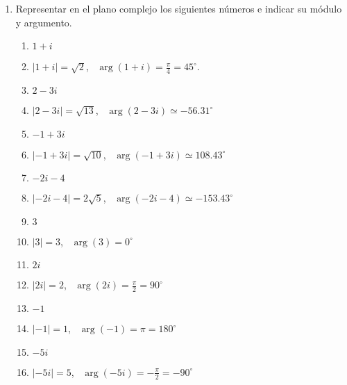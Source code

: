 \documentclass[a4paper]{article}
\newcommand{\answer}{\item[**]}
\newcommand{\exercise}{\item}
\newcommand{\df}[2]{\displaystyle\frac{#1}{#2}}
\begin{document}
\begin{enumerate}
\begin{multicols}{2}
\begin{enumerate} [label=(\alph*)]
		\item $\df{5-2i}{5i-2}$
		\answer $-\df{20}{29}-\df{21}{29}i$. \href{https://youtu.be/UK70wbES5L8}{Resolución}

		\item $\df{3+2i}{-3-4i}$
		\answer $-\df{17}{25}+\df{6}{25}i$. \href{https://youtu.be/Khdqus5O4jk}{Resolución}

		\item $\df{-3i+1}{4i-2}$
		\answer $-\df{7}{10}+\df{1}{10}i$. \href{https://youtu.be/VguP5HyAzpQ}{Resolución}

		\item $(1-2i)^2$
		\answer $-3-4i$

		\item $\df{i}{i+1}+\left(\df{1+i}{i}\right)^2$
		\answer $\df{1}{2}-\df{3}{2}i$. \href{https://youtu.be/edNxbzDs2wA}{Resolución}

		\item $(1+2i)^3$
		\answer $-11-2i$

	\end{enumerate}
	\end{multicols}


	\exercise Representar en el plano complejo los siguientes números e indicar su módulo y argumento.
	\begin{multicols}{3}
	\begin{enumerate} [label=(\alph*)]
		
		\item $1+i$
		\answer $|1+i|=\sqrt{2}$, ~$\arg(1+i)=\df{\pi}{4}=45^{\circ}$. 

		\item $2-3i$
		\answer $|2-3i|=\sqrt{13}$, ~$\arg(2-3i) \simeq -56.31^{\circ}$

		\item $-1+3i$
		\answer $|-1+3i|=\sqrt{10}$, ~$\arg(-1+3i) \simeq 108.43^{\circ}$

		\item $-2i-4$
		\answer $|-2i-4|=2\sqrt{5}$, ~$\arg(-2i-4) \simeq -153.43^{\circ}$

		\item $3$
		\answer $|3|=3$, ~$\arg(3)=0^{\circ}$

		\item $2i$
		\answer $|2i|=2$, ~$\arg(2i)=\df{\pi}{2}=90^{\circ}$
	
		\item $-1$
		\answer $|-1|=1$, ~$\arg(-1)=\pi=180^{\circ}$

		\item $-5i$
		\answer $|-5i|=5$, ~$\arg(-5i)=-\df{\pi}{2}=-90^{\circ}$


\end{enumerate}
\end{multicols}
\end{enumerate}
\end{document}
